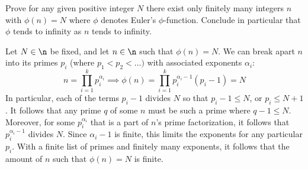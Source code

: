 \begin{problems}
\begin{breakablealgorithm}
\begin{algorithmic}[1]
            
                \EndWhile
            \EndWhile
            
        \end{algorithmic}
    \end{breakablealgorithm}
    \item Prove for any given positive integer $N$ there exist only finitely many integers $n$ with $\phi(n) = N$ where $\phi$ denotes Euler's $\phi$-function. Conclude in particular that $\phi$ tends to infinity as $n$ tends to infinity.
    \begin{sol}
        Let $N \in \n$ be fixed, and let $n \in \n$ such that $\phi(n) = N$. We can break apart $n$ into its primes $p_i$ (where $p_1 < p_2 < \dots)$ with associated exponents $\alpha_i$:
        $$n = \prod_{i = 1}^k p_i^{\alpha_i} \implies \phi(n) = \prod_{i = 1}^k p_i^{\alpha_i - 1}(p_i - 1) = N$$
        In particular, each of the terms $p_i - 1$ divides $N$ so that $p_i - 1 \leq N$, or $p_i \leq N + 1$. It follows that any prime $q$ of some $n$ must be such a prime where $q - 1 \leq N$. Moreover, for some $p_i^{\alpha_i}$ that is a part of $n$'s prime factorization, it follows that $p_i^{\alpha_i - 1}$ divides $N$. Since $\alpha_i - 1$ is finite, this limits the exponents for any particular $p_i$. With a finite list of primes and finitely many exponents, it follows that the amount of $n$ such that $\phi(n) = N$ is finite.
        

\end{sol}
\end{problems}
